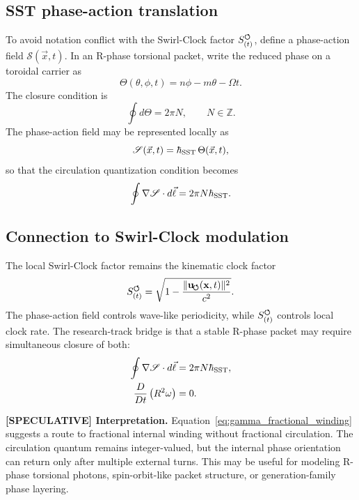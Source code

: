 \subsection{SST phase-action translation}
To avoid notation conflict with the Swirl-Clock factor ${S_{(t)}^{\boldsymbol{\circlearrowleft}}}$, define a phase-action field $\mathscr S(\vec x,t)$. In an R-phase torsional packet, write the reduced phase on a toroidal carrier as
\begin{equation}
    \Theta(\theta,\phi,t)
    = n\phi-m\theta-\Omega t.
    \label{eq:sst_torus_phase}
\end{equation}
The closure condition is
\begin{equation}
    \oint d\Theta = 2\pi N,
    \qquad N\in\mathbb Z.
    \label{eq:phase_closure_condition}
\end{equation}
The phase-action field may be represented locally as
\begin{equation}
    \mathscr S(\vec x,t)=\hbar_{\rm SST}\,\Theta(\vec x,t),
    \label{eq:phase_action_relation}
\end{equation}
so that the circulation quantization condition becomes
\begin{equation}
    \oint \nabla\mathscr S\cdot d\vec\ell
    =2\pi N\hbar_{\rm SST}.
    \label{eq:phase_action_quantization}
\end{equation}

\subsection{Connection to Swirl-Clock modulation}
The local Swirl-Clock factor remains the kinematic clock factor
\begin{equation}
    {S_{(t)}^{\boldsymbol{\circlearrowleft}}}
    =\sqrt{1-\frac{\lVert\mathbf{u}_{\!\boldsymbol{\circlearrowleft}}(\mathbf{x},t)\rVert^2}{c^2}}.
    \label{eq:swirl_clock_factor_appendix}
\end{equation}
The phase-action field controls wave-like periodicity, while ${S_{(t)}^{\boldsymbol{\circlearrowleft}}}$ controls local clock rate. The research-track bridge is that a stable R-phase packet may require simultaneous closure of both:
\begin{align}
    \oint \nabla\mathscr S\cdot d\vec\ell &=2\pi N\hbar_{\rm SST},\label{eq:phase_closure}\\
    \frac{D}{Dt}\left(R^2\omega\right)&=0.\label{eq:kelvin_closure}
\end{align}

\textbf{[SPECULATIVE] Interpretation.}
Equation~\eqref{eq:gamma_fractional_winding} suggests a route to fractional internal winding without fractional circulation. The circulation quantum remains integer-valued, but the internal phase orientation can return only after multiple external turns. This may be useful for modeling R-phase torsional photons, spin-orbit-like packet structure, or generation-family phase layering.

